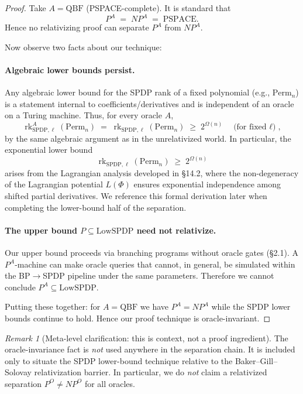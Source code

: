 \documentclass[12pt]{article}
\theoremstyle{definition}
\theoremstyle{definition}
\theoremstyle{remark}
\newtheorem{remark}{Remark}
\theoremstyle{remark}
\begin{document}
\begin{proof}
Take $A = \mathrm{QBF}$ (PSPACE-complete). It is standard that
\[
P^A \;=\; NP^A \;=\; \mathrm{PSPACE}.
\]
Hence no relativizing proof can separate $P^A$ from $NP^A$.

Now observe two facts about our technique:

\paragraph{Algebraic lower bounds persist.}
Any algebraic lower bound for the SPDP rank of a fixed polynomial (e.g., $\mathrm{Perm}_n$) is a statement internal to coefficients/derivatives and is independent of an oracle on a Turing machine. Thus, for every oracle $A$,
\[
\operatorname{rk}_{\mathrm{SPDP},\ell}^A(\mathrm{Perm}_n) \;=\; \operatorname{rk}_{\mathrm{SPDP},\ell}(\mathrm{Perm}_n) \;\ge\; 2^{\Omega(n)} \quad\text{(for fixed $\ell$)},
\]
by the same algebraic argument as in the unrelativized world. In particular, the exponential lower bound
\[
\operatorname{rk}_{\mathrm{SPDP},\ell}(\mathrm{Perm}_n) \;\ge\; 2^{\Omega(n)}
\]
arises from the Lagrangian analysis developed in \S14.2, where the non-degeneracy of the Lagrangian potential $L(\Phi)$ ensures exponential independence among shifted partial derivatives. We reference this formal derivation later when completing the lower-bound half of the separation.

\paragraph{The upper bound $P \subseteq \mathrm{LowSPDP}$ need not relativize.}
Our upper bound proceeds via branching programs without oracle gates (\S2.1). A $P^A$-machine can make oracle queries that cannot, in general, be simulated within the BP$\to$SPDP pipeline under the same parameters. Therefore we cannot conclude $P^A \subseteq \mathrm{LowSPDP}$.

Putting these together: for $A = \mathrm{QBF}$ we have $P^A = NP^A$ while the SPDP lower bounds continue to hold. Hence our proof technique is oracle-invariant.
\end{proof}

\begin{remark}[Meta-level clarification: this is context, not a proof ingredient]
The oracle-invariance fact is \emph{not} used anywhere in the separation chain.
It is included only to situate the SPDP lower-bound technique relative to the
Baker--Gill--Solovay relativization barrier.
In particular, we do \emph{not} claim a relativized separation $P^O\neq NP^O$ for all oracles.
\end{remark}
\end{document}
